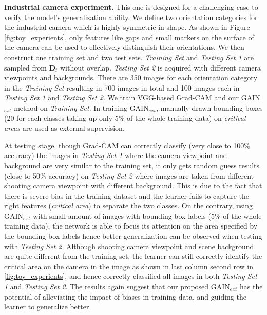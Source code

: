 \documentclass[10pt,twocolumn,letterpaper]{article}
\begin{document}
\textbf{Industrial camera experiment.} This one is designed for a challenging case to verify the model's generalization ability. We define two orientation categories for the industrial camera which is highly symmetric in shape. As shown in Figure \ref{fig:toy_experients}, only features like gaps and small markers on the surface of the camera can be used to effectively distinguish their orientations. We then construct one training set and two test sets. \textit{Training Set} and \textit{Testing Set 1} are sampled from $\textbf{D}_t$ without overlap. \textit{Testing Set 2} is acquired with different camera viewpoints and backgrounds. There are 350 images for each orientation category in the \emph{Training Set}  resulting in 700 images in total and 100 images each in \emph{Testing Set 1} and \emph{Testing Set 2}. We train VGG-based Grad-CAM and our GAIN$_{ext}$ method on \emph{Training Set}. In training GAIN$_{ext}$, manually drawn bounding boxes (20 for each classes taking up only 5\% of the whole training data) on \textit{critical areas} are used as external supervision. 

At testing stage, though Grad-CAM can correctly classify (very close to 100\% accuracy) the images in \emph{Testing Set 1} where the camera viewpoint and background are very similar to the training set, it only gets random guess results (close to 50\% accuracy) on \emph{Testing Set 2} where images are taken from different shooting camera viewpoint with different background. This is due to the fact that there is severe bias in the training dataset and the learner fails to capture the right features (\textit{critical area}) to separate the two classes. On the contrary, using GAIN$_{ext}$ with small amount of images with bounding-box labels (5\% of the
whole training data), the network is able to focus its attention on the area specified by the bounding box labels hence better generalization can be observed when testing with \emph{Testing Set 2}. Although shooting camera viewpoint and scene background are quite different from the training set, the learner can still correctly identify the critical area on the camera in the image as shown in last column second row in \ref{fig:toy_experients}, and hence correctly classified all images in both \emph{Testing Set 1} and \emph{Testing Set 2}. The results again suggest that our proposed GAIN$_{ext}$ has the potential of alleviating the impact of biases in training data, and guiding the learner to generalize better. 
\end{document}
